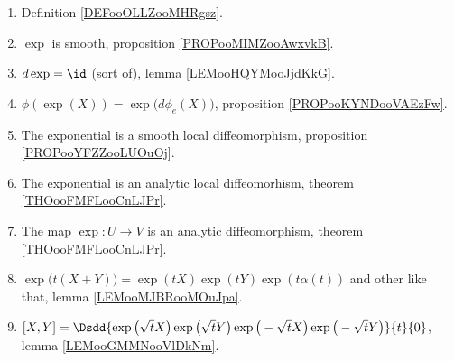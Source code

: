 	\label{THEMEooExponential}
\begin{enumerate}
	\item
	      Definition \ref{DEFooOLLZooMHRgsz}.
	\item
	      \( \exp\) is smooth, proposition \ref{PROPooMIMZooAwxvkB}.
	\item
	      \( d\exp=\id\) (sort of), lemma \ref{LEMooHQYMooJjdKkG}.
	\item
	      \( \phi(\exp(X))=\exp\big( d\phi_e(X) \big)\), proposition \ref{PROPooKYNDooVAEzFw}.
	\item
	      The exponential is a smooth local diffeomorphism, proposition \ref{PROPooYFZZooLUOuOj}.
	\item
	      The exponential is an analytic local diffeomorhism, theorem \ref{THOooFMFLooCnLJPr}.
	\item
	      The map \( \exp\colon U\to V\) is an analytic diffeomorphism, theorem \ref{THOooFMFLooCnLJPr}.
	\item
	      \( \exp\big( t(X+Y) \big)=\exp(tX)\exp(tY)\exp(t\alpha(t))\) and other like that, lemma \ref{LEMooMJBRooMOuJpa}.
	\item
	      $[X,Y]=\Dsdd{ \exp\big( \sqrt{ t }X \big)\exp\big( \sqrt{ t }Y \big)\exp\big( -\sqrt{ t }X \big)\exp\big( -\sqrt{ t }Y \big) }{t}{0}$, lemma \ref{LEMooGMMNooVlDkNm}.
\end{enumerate}
